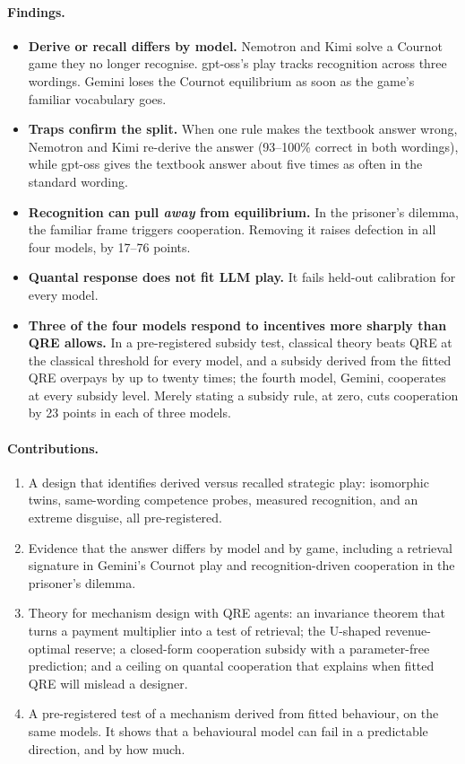 \documentclass[11pt]{article}
\theoremstyle{definition}
\theoremstyle{remark}
\begin{document}
\paragraph{Findings.}
\begin{itemize}
\item \textbf{Derive or recall differs by model.} Nemotron and Kimi solve a Cournot game they no
  longer recognise. gpt-oss's play tracks recognition across three wordings. Gemini loses the
  Cournot equilibrium as soon as the game's familiar vocabulary goes.
\item \textbf{Traps confirm the split.} When one rule makes the textbook answer wrong, Nemotron
  and Kimi re-derive the answer (93--100\% correct in both wordings), while gpt-oss gives the
  textbook answer about five times as often in the standard wording.
\item \textbf{Recognition can pull \emph{away} from equilibrium.} In the prisoner's dilemma, the
  familiar frame triggers cooperation. Removing it raises defection in all four models, by
  17--76 points.
\item \textbf{Quantal response does not fit LLM play.} It fails held-out calibration for every
  model.
\item \textbf{Three of the four models respond to incentives more sharply than QRE allows.} In a
  pre-registered subsidy test, classical theory beats QRE at the classical threshold for every
  model, and a subsidy derived from the fitted QRE overpays by up to twenty times; the fourth
  model, Gemini, cooperates at every subsidy level. Merely stating a subsidy rule, at zero, cuts cooperation by
  23 points in each of three models.
\end{itemize}

\paragraph{Contributions.}
\begin{enumerate}
\item A design that identifies derived versus recalled strategic play: isomorphic twins,
  same-wording competence probes, measured recognition, and an extreme disguise, all
  pre-registered.
\item Evidence that the answer differs by model and by game, including a retrieval signature in
  Gemini's Cournot play and recognition-driven cooperation in the prisoner's dilemma.
\item Theory for mechanism design with QRE agents: an invariance theorem that turns a payment
  multiplier into a test of retrieval; the U-shaped revenue-optimal reserve; a closed-form
  cooperation subsidy with a parameter-free prediction; and a ceiling on quantal cooperation
  that explains when fitted QRE will mislead a designer.
\item A pre-registered test of a mechanism derived from fitted behaviour, on the same models.
  It shows that a behavioural model can fail in a predictable direction, and by how much.
\end{enumerate}
\end{document}
